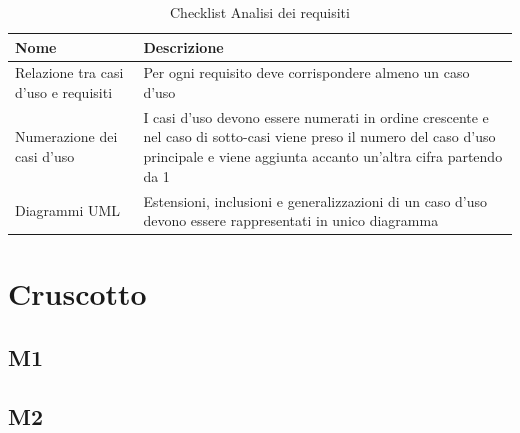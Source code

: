 \documentclass[a4paper,12pt]{article}
\begin{document}
                \begin{longtable}{|M{3.5cm}|M{8.5cm}|}
                    
                    \caption{Checklist Analisi dei requisiti} \\
                    \hline
                    \textbf{Nome} & \textbf{Descrizione} \\
                    \hline
                    \endhead

                    Relazione tra casi d’uso e requisiti & Per ogni requisito deve corrispondere almeno un caso d’uso \\
                    \hline

                    Numerazione dei casi d’uso & I casi d’uso devono essere numerati in ordine crescente e nel caso di sotto-casi viene preso il numero del caso d’uso principale e viene aggiunta accanto un’altra cifra partendo da 1 \\
                    \hline

                    Diagrammi UML & Estensioni, inclusioni e generalizzazioni di un caso d’uso devono essere rappresentati in unico diagramma \\
                    \hline

                \end{longtable}

        


    \section{Cruscotto}
        \subsection{M1}

        \subsection{M2}
\end{document}
